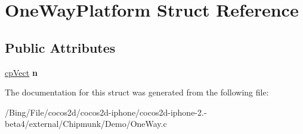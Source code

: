 \hypertarget{struct_one_way_platform}{\section{One\-Way\-Platform Struct Reference}
\label{struct_one_way_platform}
}
\subsection*{Public Attributes}
\begin{DoxyCompactItemize}
\item 
\hypertarget{struct_one_way_platform_ab22cfb391feed11a5c780113120c21fd}{\hyperlink{structcp_vect}{cp\-Vect} {\bfseries n}}\label{struct_one_way_platform_ab22cfb391feed11a5c780113120c21fd}

\end{DoxyCompactItemize}


The documentation for this struct was generated from the following file\-:\begin{DoxyCompactItemize}
\item 
/\-Bing/\-File/cocos2d/cocos2d-\/iphone/cocos2d-\/iphone-\/2.-\/beta4/external/\-Chipmunk/\-Demo/One\-Way.\-c\end{DoxyCompactItemize}
